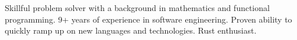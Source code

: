 

\begin{cvparagraph}

Skillful problem solver with a background in mathematics and
  functional programming.  9+ years of experience in
  software engineering.  Proven ability to quickly ramp up on new
  languages and technologies. Rust enthusiast.
\end{cvparagraph}
